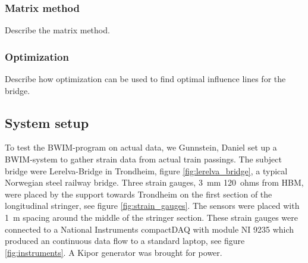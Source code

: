 \subsubsection{Matrix method}
Describe the matrix method.

\subsubsection{Optimization}
Describe how optimization can be used to find optimal influence lines for the bridge.

\subsection{System setup}
\label{system_setup}
To test the BWIM-program on actual data, we Gunnstein, Daniel set up a BWIM-system to gather strain data from actual train passings. The subject bridge were Lerelva-Bridge in Trondheim, figure \ref{fig:lerelva_bridge}, a typical Norwegian steel railway bridge. Three strain gauges, \SI{3}{\mm} \SI{120}{ohms} from HBM, were placed by the support towards Trondheim on the first section of the longitudinal stringer, see figure \ref{fig:strain_gauges}. The sensors were placed with \SI{1}{\m} spacing around the middle of the stringer section. These strain gauges were connected to a National Instruments compactDAQ with module NI 9235 which produced an continuous data flow to a standard laptop, see figure \ref{fig:instruments}. A Kipor generator was brought for power.
